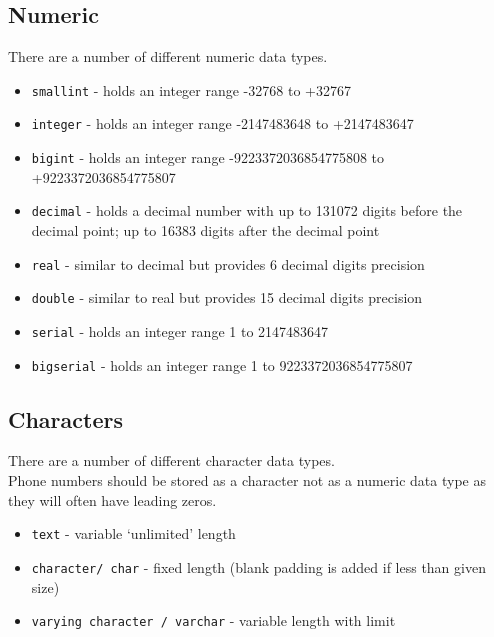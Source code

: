 \subsection*{Numeric}
There are a number of different numeric data types.
\begin{itemize}
    \item \texttt{smallint} - holds an integer range -32768 to +32767
    \item \texttt{integer} - holds an integer range -2147483648 to +2147483647
    \item \texttt{bigint} - holds an integer range -9223372036854775808 to +9223372036854775807
    \item \texttt{decimal} - holds a decimal number with up to 131072 digits before the decimal point; up to 16383 digits after the decimal point
    \item \texttt{real} - similar to decimal but provides 6 decimal digits precision
    \item \texttt{double} - similar to real but provides 15 decimal digits precision
    \item \texttt{serial} - holds an integer range 1 to 2147483647
    \item \texttt{bigserial} - holds an integer range 1 to 9223372036854775807
\end{itemize}
\subsection*{Characters}
There are a number of different character data types.\\
Phone numbers should be stored as a character not as a numeric data type as they will often have leading zeros. 
\begin{itemize}
    \item \texttt{text} - variable `unlimited' length
    \item \texttt{character/ char} - fixed length (blank padding is added if less than given size)
    \item \texttt{varying character / varchar} - variable length with limit
\end{itemize}

